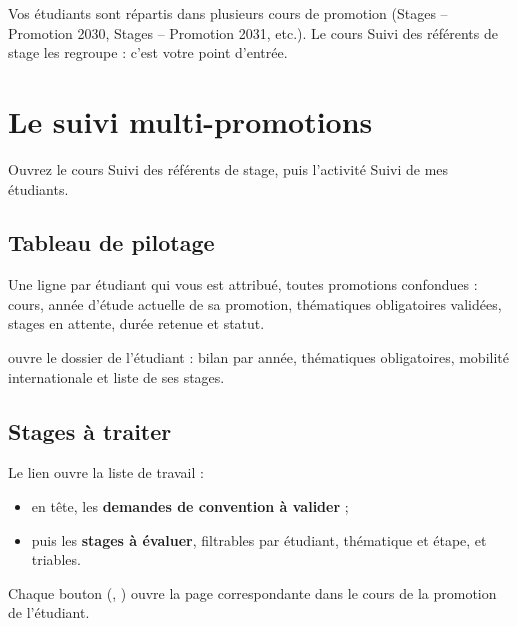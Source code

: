 \documentclass[11pt,a4paper]{article}
\begin{document}
Vos étudiants sont répartis dans plusieurs cours de promotion
(\og Stages -- Promotion 2030\fg{}, \og Stages -- Promotion 2031\fg{}, etc.).
Le cours \og Suivi des référents de stage\fg{} les regroupe : c'est votre point
d'entrée.

\section{Le suivi multi-promotions}

Ouvrez le cours \og Suivi des référents de stage\fg{}, puis l'activité
\og Suivi de mes étudiants\fg{}.

\subsection{Tableau de pilotage}

Une ligne par étudiant qui vous est attribué, toutes promotions confondues :
cours, année d'étude actuelle de sa promotion, thématiques obligatoires validées,
stages en attente, durée retenue et statut.


 ouvre le dossier de l'étudiant : bilan par année,
thématiques obligatoires, mobilité internationale et liste de ses stages.


\subsection{Stages à traiter}

Le lien  ouvre la liste de travail :
\begin{itemize}
  \item en tête, les \textbf{demandes de convention à valider} ;
  \item puis les \textbf{stages à évaluer}, filtrables par étudiant, thématique
        et étape, et triables.
\end{itemize}


Chaque bouton (, ) ouvre la page
correspondante dans le cours de la promotion de l'étudiant.
\end{document}
